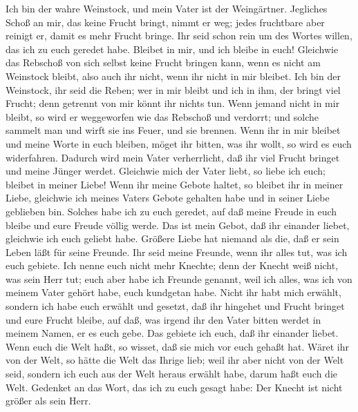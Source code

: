  Ich bin der wahre Weinstock, und mein Vater ist der
Weingärtner.  Jegliches Schoß an mir, das keine Frucht
bringt, nimmt er weg; jedes fruchtbare aber reinigt er, damit es mehr
Frucht bringe.  Ihr seid schon rein um des Wortes willen,
das ich zu euch geredet habe.  Bleibet in mir, und ich
bleibe in euch! Gleichwie das Rebschoß von sich selbst keine Frucht
bringen kann, wenn es nicht am Weinstock bleibt, also auch ihr nicht,
wenn ihr nicht in mir bleibet.  Ich bin der Weinstock, ihr
seid die Reben; wer in mir bleibt und ich in ihm, der bringt viel
Frucht; denn getrennt von mir könnt ihr nichts tun.  Wenn
jemand nicht in mir bleibt, so wird er weggeworfen wie das Rebschoß und
verdorrt; und solche sammelt man und wirft sie ins Feuer, und sie
brennen.  Wenn ihr in mir bleibet und meine Worte in euch
bleiben, möget ihr bitten, was ihr wollt, so wird es euch widerfahren.
 Dadurch wird mein Vater verherrlicht, daß ihr viel Frucht
bringet und meine Jünger werdet.  Gleichwie mich der Vater
liebt, so liebe ich euch; bleibet in meiner Liebe!  Wenn
ihr meine Gebote haltet, so bleibet ihr in meiner Liebe, gleichwie ich
meines Vaters Gebote gehalten habe und in seiner Liebe geblieben bin.
 Solches habe ich zu euch geredet, auf daß meine Freude
in euch bleibe und eure Freude völlig werde.  Das ist
mein Gebot, daß ihr einander liebet, gleichwie ich euch geliebt habe.
 Größere Liebe hat niemand als die, daß er sein Leben
läßt für seine Freunde.  Ihr seid meine Freunde, wenn ihr
alles tut, was ich euch gebiete.  Ich nenne euch nicht
mehr Knechte; denn der Knecht weiß nicht, was sein Herr tut; euch aber
habe ich Freunde genannt, weil ich alles, was ich von meinem Vater
gehört habe, euch kundgetan habe.  Nicht ihr habt mich
erwählt, sondern ich habe euch erwählt und gesetzt, daß ihr hingehet und
Frucht bringet und eure Frucht bleibe, auf daß, was irgend ihr den Vater
bitten werdet in meinem Namen, er es euch gebe.  Das
gebiete ich euch, daß ihr einander liebet.  Wenn euch die
Welt haßt, so wisset, daß sie mich vor euch gehaßt hat. 
Wäret ihr von der Welt, so hätte die Welt das Ihrige lieb; weil ihr aber
nicht von der Welt seid, sondern ich euch aus der Welt heraus erwählt
habe, darum haßt euch die Welt.  Gedenket an das Wort,
das ich zu euch gesagt habe: Der Knecht ist nicht größer als sein Herr.
